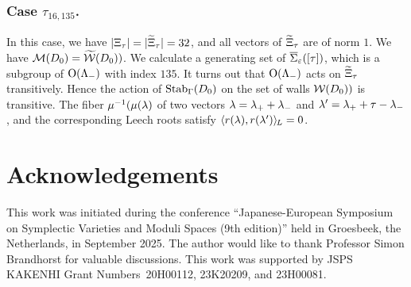\documentclass{amsart} %
\begin{document}
\subsubsection{Case $\tau_{16, 135}$.}
In this case,
we have $|\Xi_{\tau}|=|\widetilde{\Xi}_{\tau}|=32$,
and all vectors of $\widetilde{\Xi}_{\tau}$ are of norm $1$.
We have $\mathord{\mathcal{M}}(D_0)=\widetilde{\mathord{\mathcal{W}}}(D_0))$.
We calculate a generating set of $\overline{\Sigma}_{\varepsilon} ([\tau])$,
which is a subgroup of $ \mathord{\mathrm{O}}(\Lambda_{-})$ with index $135$.
It turns out that $ \mathord{\mathrm{O}}(\Lambda_{-})$ acts on $\widetilde{\Xi}_{\tau}$ transitively.
Hence the action of $\operatorname{Stab}_{\Gamma}(D_0)$ on the set of walls $\mathord{\mathcal{W}}(D_0))$ is transitive.
The fiber 
 $\mu^{-1}(\mu(\lambda)$ 
of two vectors
$\lambda={\lambda}_{+}+{\lambda}_{-}$ and $\lambda^{\prime}={\lambda}_{+}+\tau-{\lambda}_{-}$, and 
the corresponding Leech roots 
 satisfy
$\langle r(\lambda), r(\lambda^{\prime}) \rangle_{\hskip -1pt L}=0$.
%
 
\section*{Acknowledgements}
This work was initiated during the conference ``Japanese-European Symposium on Symplectic Varieties and Moduli Spaces (9th edition)''
held in Groesbeek, the Netherlands,  in September 2025.
The author would like to thank Professor Simon Brandhorst for valuable discussions.
This work was supported by JSPS KAKENHI Grant Numbers~20H00112, 23K20209, and 23H00081.

 
%
%



%
\end{document}
